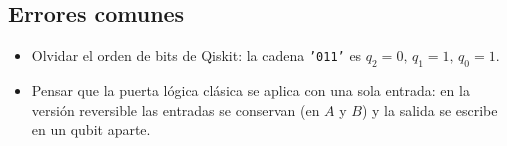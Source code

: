 \subsection{Errores comunes}
\begin{itemize}
  \item Olvidar el orden de bits de Qiskit: la cadena \texttt{'011'} es
    $q_2=0,\,q_1=1,\,q_0=1$.
  \item Pensar que la puerta lógica clásica se aplica con una sola entrada: en
    la versión reversible las entradas se conservan (en $A$ y $B$) y la salida
    se escribe en un qubit aparte.
\end{itemize}


